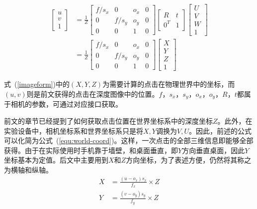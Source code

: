 \begin{equation}
    \label{imageform}
    \begin{aligned}
    \begin{bmatrix}
        u \\
        v \\
        1
    \end{bmatrix}
    &= \frac{1}{Z} \begin{bmatrix}
        f / s_x & 0 & o_x & 0\\
        0 & f / s_y & o_y & 0 \\
        0 & 0 & 1 & 0
      \end{bmatrix}
      \begin{bmatrix}
        R & t \\
        0^{T} & 1
      \end{bmatrix}
      \begin{bmatrix}
        U \\
        V \\
        W \\
        1
      \end{bmatrix} \\
    &= \frac{1}{Z} \begin{bmatrix}
        f / s_x & 0 & o_x & 0\\
        0 & f / s_y & o_y & 0 \\
        0 & 0 & 1 & 0
      \end{bmatrix}
      \begin{bmatrix}
        X \\
        Y \\
        Z \\
        1
      \end{bmatrix}
    \end{aligned}
\end{equation}

式~(\ref{imageform})中的$(X, Y, Z)$为需要计算的点击在物理世界中的坐标，而$(u, v)$则是前文获得的点击在深度图像中的位置。$f$，$s_x$，$s_y$，$o_x$，$o_y$，$R$，$t$都属于相机的参数，可通过对应接口获取。

前文的章节已经提到了如何获取点击位置在世界坐标系中的深度坐标$Z$。此外，在实验设备中，相机坐标系和世界坐标系只是将$X, Y$调换为$V, U$。因此，前述的公式可以化简为公式~(\ref{equ:world-coord})。这样，一次点击的全部三维信息即能够全部获得。由于在实际使用时手机靠于墙壁，和桌面垂直，即$Y$方向垂直桌面，因此$Y$坐标基本为定值。后文中主要用到$X$和$Z$方向坐标，为了表述方便，仍然将其称之为横轴和纵轴。
\begin{equation}
  \begin{aligned}
  X &= \frac{(u - o_x)s_x}{f_x} \times Z \\
  Y &= \frac{(v - o_y)s_y}{f_y} \times Z
  \end{aligned}
  \label{equ:world-coord}
\end{equation}


